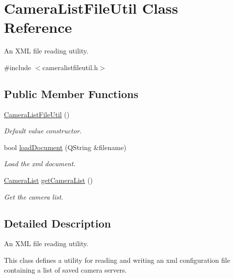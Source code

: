 \hypertarget{classCameraListFileUtil}{\section{Camera\-List\-File\-Util Class Reference}
\label{classCameraListFileUtil}
}


An X\-M\-L file reading utility.  




{\ttfamily \#include $<$cameralistfileutil.\-h$>$}

\subsection*{Public Member Functions}
\begin{DoxyCompactItemize}
\item 
\hyperlink{classCameraListFileUtil_a8966248618d4fbd76c573dfaf009f42a}{Camera\-List\-File\-Util} ()
\begin{DoxyCompactList}\small\item\em Default value constructor. \end{DoxyCompactList}\item 
bool \hyperlink{classCameraListFileUtil_abb70006319c1301e47e02bd17d2098e2}{load\-Document} (Q\-String \&filename)
\begin{DoxyCompactList}\small\item\em Load the xml document. \end{DoxyCompactList}\item 
\hyperlink{camera_8h_a4e5cc6bdc5723a4d61f3aac69dbb083a}{Camera\-List} \hyperlink{classCameraListFileUtil_a8ea7a7091551688c46f5077d2fe632e9}{get\-Camera\-List} ()
\begin{DoxyCompactList}\small\item\em Get the camera list. \end{DoxyCompactList}\end{DoxyCompactItemize}


\subsection{Detailed Description}
An X\-M\-L file reading utility. 

This class defines a utility for reading and writing an xml configuration file containing a list of saved camera servers. 

